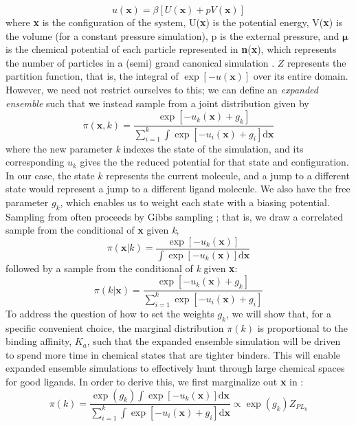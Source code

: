 \documentclass[12pt]{article}
\begin{document}
\begin{equation} \label{reducedu} u(\textbf{x})=\beta[U(\textbf{x})+pV(\textbf{x})] \end{equation}
where \textbf{x} is the configuration of the system, U(\textbf{x}) is the potential energy, V(\textbf{x}) is the volume (for a constant pressure simulation), p is the external pressure, and $\boldsymbol\mu$ is the chemical potential of each particle represented in \textbf{n}(\textbf{x}), which represents the number of particles in a (semi) grand canonical simulation \cite{shirts2008}. $Z$ represents the partition function, that is, the integral of $\exp[-u(\textbf{x})]$ over its entire domain. However, we need not restrict ourselves to this; we can define an \emph{expanded ensemble} such that we instead sample from a joint distribution given by \begin{equation} \label{eq:exens} \pi(\textbf{x},k)=\frac{\exp[-u_k(\textbf{x})+g_k]}{\sum_{i=1}^{k}\int \exp[-u_i(\textbf{x})+g_i] \mathrm{d}\textbf{x}} \end{equation} where the new parameter \textit{k} indexes the state of the simulation, and its corresponding $u_k$ gives the the reduced potential for that state and configuration. In our case, the state $k$ represents the current molecule, and a jump to a different state would represent a jump to a different ligand molecule. We also have the free parameter $g_k$, which enables us to weight each state with a biasing potential. Sampling from  often proceeds by Gibbs sampling \cite{liu}; that is, we draw a correlated sample from the conditional of \textbf{x} given \textit{k},
%
\begin{equation} \label{eq:xgivenk} \pi(\textbf{x}|k)=\frac{\exp[-u_k(\textbf{x})]}{\int \exp[-u_k(\textbf{x})] \mathrm{d}\textbf{x}} \end{equation}
%
followed by a sample from the conditional of \textit{k} given \textbf{x}:
%
\begin{equation} \label{eq:kgivenx} \pi(k|\textbf{x})=\frac{\exp[-u_k(\textbf{x})+g_k]}{\sum_{i=1}^{k}\exp[-u_i(\textbf{x})+g_i]} \end{equation}
%
To address the question of how to set the weights $g_k$, we will show that, for a specific convenient choice, the marginal distribution $\pi(k)$ is proportional to the binding affinity, $K_a$, such that the expanded ensemble simulation will be driven to spend more time in chemical states that are tighter binders.  This will enable expanded ensemble simulations to effectively hunt through large chemical spaces for good ligands. In order to derive this, we first marginalize out \textbf{x} in :
\begin{equation} \label{eq:marginalk} \pi(k)=\frac{\exp(g_k)\int \exp[-u_k(\textbf{x})] \mathrm{d}\textbf{x}}{\sum_{i=1}^{k}\int \exp[-u_i(\textbf{x})+g_i] \mathrm{d}\textbf{x}}\propto\exp(g_k)Z_{PL_k} \end{equation}
\end{document}
